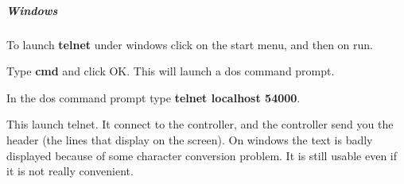 \subparagraph{Windows}
\label{webots.firstrun.clientsoftware.telnet.windows}%

To launch \textbf{telnet} under windows click on the start menu, and
then on run.




Type \textbf{cmd} and click OK. This will launch a dos command prompt.




In the dos command prompt type \textbf{telnet localhost 54000}.




This launch telnet. It connect to the \urbi controller, and the \urbi
controller send you the \urbi header (the lines that display on the
screen). On windows the text is badly displayed because of some
character conversion problem. It is still usable even if it is not
really convenient.




